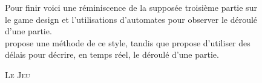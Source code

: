 \documentclass{cours}
\begin{document}
\begin{figure}
    \centering
    \caption{\textsc{Le Jeu}}
    \label{fig:dfa:lejeu}
    \begin{center}
        Pour finir voici une réminiscence de la supposée troisième partie sur le game design et l'utilisations d'automates pour observer le déroulé d'une partie.\\ \cite{game-design-automata} propose une méthode de ce style, tandis que \cite{timed-automatas-games} propose d'utiliser des délais pour décrire, en temps réel, le déroulé d'une partie. 
    \end{center}
\end{figure}
\end{document}
